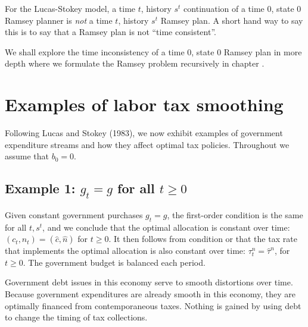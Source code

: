   For the Lucas-Stokey model, a time $t$, history $s^t$ continuation  of a time $0$, state $0$ Ramsey planner is
{\it not\/} a time $t$, history $s^t$ Ramsey plan.
A short hand way to say this is to say that
a Ramsey plan is not ``time consistent''.
%

\medskip

\noindent We shall explore the time inconsistency  of a  time  $0$, state $0$ Ramsey plan in more depth  %
 where we formulate
the Ramsey problem recursively in chapter .



\section{Examples of labor tax smoothing}\label{sec:labor_tax_smoothing}
Following Lucas and Stokey (1983),
we now exhibit examples of government expenditure streams and how
they affect optimal tax policies. %
Throughout we assume that
$b_0=0$.


\subsection{Example 1: $g_t=g$ for all $t\geq0$}
Given  constant  government purchases $g_t=g$, the first-order condition
 is the same for all $t, s^t$, and we conclude that the
optimal allocation is constant over time: $(c_t,n_t)=(\hat c, \hat n)$
for $t\geq 0$. It then follows from condition  or
 that the tax rate
that  implements the optimal allocation is also constant over
time: $\tau^n_t=\hat \tau^n$, for $t\geq 0$.
The government budget is balanced  each period.

Government debt issues in this economy  serve to smooth
distortions over time. Because government expenditures are already smooth
in this economy, they are optimally financed from contemporaneous
taxes. Nothing is gained by using debt to change the timing of tax
collections.


